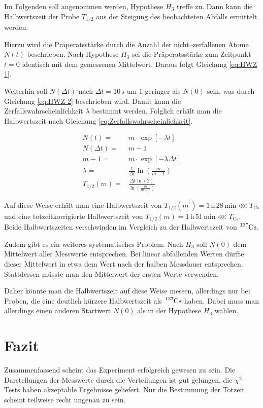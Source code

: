 \documentclass[12pt,a4paper]{scrartcl}
\numberwithin{equation}{section} %
\begin{document}
Im Folgenden soll angenommen werden, Hypothese $H_3$ treffe zu. Dann kann die Halbwertszeit der Probe $T_{1/2}$ aus der Steigung des beobachteten Abfalls ermittelt werden.

Hierzu wird die Präperatsstärke durch die Anzahl der nicht--zerfallenen Atome $N(t)$ beschrieben. Nach Hypothese $H_3$ sei die Präperatsstärke zum Zeitpunkt $t=0$ identisch mit dem gemessenen Mittelwert. Daraus folgt Gleichung \eqref{eq:HWZ 1}.

Weiterhin soll $N(\Delta t)$ nach $\Delta t=10\mathrm{\,s}$ um $1$ geringer als $N(0)$ sein, was durch Gleichung \eqref{eq:HWZ 2} beschrieben wird. Damit kann die Zerfallswahrscheinlichkeit $\lambda$ bestimmt werden. Folglich erhält man die Halbwertszeit nach Gleichung \eqref{eq:Zerfallswahrscheinlichkeit}.

\begin{align}
	N(t) =& m \cdot \exp[-\lambda t] \label{eq:HWZ 1}\\
	N(\Delta t) =& m-1 \\
	m-1 =& m \cdot \exp[-\lambda \Delta t] \label{eq:HWZ 2}\\
	\lambda =& \frac{1}{\Delta t} \ln(\frac{m}{m-1}) \\
	T_{1/2}(m) =& \frac{\Delta t \ln(2)}{\ln(\frac{m}{m-1})}
\end{align}

\noindent
Auf diese Weise erhält man eine Halbwertszeit von $T_{1/2}(m^\prime)=1\,\mathrm{h}\,28\,\mathrm{min}\lll T_\mathrm{Cs}$ und eine totzeitkorrigierte Halbwertszeit von $T_{1/2}(m)=1\,\mathrm{h}\,51\,\mathrm{min}\lll T_\mathrm{Cs}$. Beide Halbwertszeiten verschwinden im Vergleich zu der Halbwertszeit von $\ce{^{137}Cs}$.

Zudem gibt es ein weiteres systematisches Problem. Nach $H_3$ soll $N(0)$ dem Mittelwert aller Messwerte entsprechen. Bei linear abfallenden Werten dürfte dieser Mittelwert in etwa dem Wert nach der halben Messdauer entsprechen. Stattdessen müsste man den Mittelwert der ersten Werte verwenden.

Daher könnte man die Halbwertszeit auf diese Weise messen, allerdings nur bei Proben, die eine deutlich kürzere Halbwertszeit als $\ce{^{137}Cs}$ haben. Dabei muss man allerdings einen anderen Startwert $N(0)$ als in der Hypothese $H_3$ wählen.

\clearpage
\hypertarget{fazit}{%
\section{Fazit}\label{fazit}}
Zusammenfassend scheint das Experiment erfolgreich gewesen zu sein. Die Darstellungen der Messwerte durch die Verteilungen ist gut gelungen, die $\chi^2$--Tests haben akzeptable Ergebnisse geliefert. Nur die Bestimmung der Totzeit scheint teilweise recht ungenau zu sein.
\end{document}
